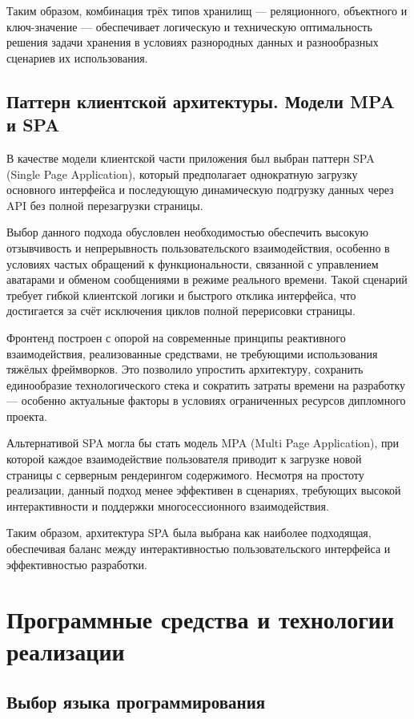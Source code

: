 Таким образом, комбинация трёх типов хранилищ —
реляционного, объектного и ключ-значение —
обеспечивает логическую и техническую оптимальность решения задачи хранения
в условиях разнородных данных и разнообразных сценариев их использования.

\subsection{Паттерн клиентской архитектуры. Модели MPA и SPA}

В качестве модели клиентской части приложения был выбран паттерн SPA (Single Page Application), который предполагает 
однократную загрузку основного интерфейса и последующую динамическую подгрузку данных через API без полной перезагрузки 
страницы.

Выбор данного подхода обусловлен необходимостью обеспечить высокую отзывчивость и непрерывность пользовательского 
взаимодействия, особенно в условиях частых обращений к функциональности, связанной с управлением аватарами и обменом 
сообщениями в режиме реального времени. Такой сценарий требует гибкой клиентской логики и быстрого отклика интерфейса, что 
достигается за счёт исключения циклов полной перерисовки страницы.

Фронтенд построен с опорой на современные принципы реактивного взаимодействия, реализованные средствами, не требующими 
использования тяжёлых фреймворков. Это позволило упростить архитектуру, сохранить единообразие технологического стека и 
сократить затраты времени на разработку — особенно актуальные факторы в условиях ограниченных ресурсов дипломного проекта.

Альтернативой SPA могла бы стать модель MPA (Multi Page Application), при которой каждое взаимодействие пользователя приводит 
к загрузке новой страницы с серверным рендерингом содержимого. Несмотря на простоту реализации, данный подход менее эффективен 
в сценариях, требующих высокой интерактивности и поддержки многосессионного взаимодействия.

Таким образом, архитектура SPA была выбрана как наиболее подходящая, обеспечивая баланс между 
интерактивностью пользовательского интерфейса и эффективностью разработки.

\section{Программные средства и технологии реализации}
\subsection{Выбор языка программирования}

